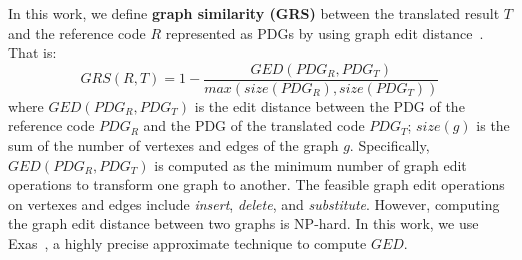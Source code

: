 In this work, we define \textbf{graph similarity (GRS)} between the
translated result $T$ and the reference code $R$ represented as PDGs
by using graph edit distance~\cite{sanfeliu}. That is:
$$GRS(R, T) = 1-\frac{GED(PDG_R, PDG_T)}{max\left(size(PDG_R),
  size(PDG_T)\right)}$$ where $GED(PDG_R, PDG_T)$ is the edit distance
between the PDG of the reference code $PDG_R$ and the PDG of the
translated code $PDG_T$; $size(g)$ is the sum of the number of
vertexes and edges of the graph $g$. Specifically, $GED(PDG_R, PDG_T)$
is computed as the minimum number of graph edit operations to
transform one graph to another. The feasible graph edit operations on
vertexes and edges include {\em insert}, {\em delete}, and {\em
  substitute}.  However, computing the graph edit distance between two
graphs is NP-hard.  In this work, we use Exas~\cite{fase09}, a highly
precise approximate technique to compute $GED$.



